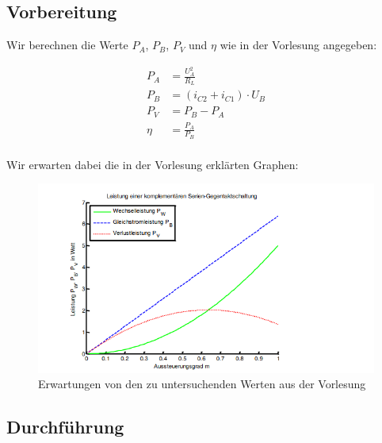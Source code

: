 \documentclass{article}
\begin{document}
\subsection{Vorbereitung}
\label{sec:vorbereitung-2}

Wir berechnen die Werte $P_{A}$, $P_{B}$, $P_{V}$ und $\eta$ wie in der Vorlesung angegeben:

\begin{align*}
  P_{A} &= \frac{U_{A}^{2}}{R_{L}}\\
  P_{B} &= (i_{C2} + i_{C1})\cdot U_{B}\\
  P_{V} &= P_{B} - P_{A}\\
  \eta &= \frac{P_{A}}{P_{B}}\\
\end{align*}

Wir erwarten dabei die in der Vorlesung erklärten Graphen:

\begin{figure}[h]
  \centering
  \includegraphics[width=\textwidth]{../assets/images/ELP2_4/erwartung.png}
  \caption{Erwartungen von den zu untersuchenden Werten aus der Vorlesung}
  \label{fig:erwartung}
\end{figure}

\subsection{Durchführung}
\label{sec:durchfuhrung}
\end{document}
